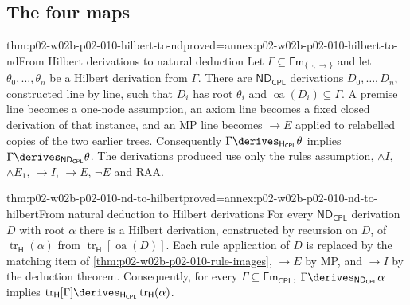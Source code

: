 \subsection{The four maps}
\label{sec:p02-w02b-p02-010-maps}

\begin{hbtheorem}{thm:p02-w02b-p02-010-hilbert-to-nd}{proved=annex:p02-w02b-p02-010-hilbert-to-nd}{From Hilbert derivations to natural deduction}
Let \(\Gamma\subseteq\mathsf{Fm}_{\{\neg,\to\}}\) and let
\(\theta_0,\ldots,\theta_n\) be a Hilbert derivation from \(\Gamma\).  There
are \(\mathsf{ND}_{\mathsf{CPL}}\) derivations \(D_0,\ldots,D_n\), constructed
line by line, such that \(D_i\) has root \(\theta_i\) and
\(\operatorname{oa}(D_i)\subseteq\Gamma\).  A premise line becomes a one-node
assumption, an axiom line becomes a fixed closed derivation of that
instance, and an MP line becomes \(\to E\) applied to relabelled copies of
the two earlier trees.  Consequently
\(\Gamma\derives_{\mathsf H_{\mathsf{CPL}}}\theta\) implies
\(\Gamma\derives_{\mathsf{ND}_{\mathsf{CPL}}}\theta\).  The derivations
produced use only the rules assumption, \(\land I\), \(\land E_1\),
\(\to I\), \(\to E\), \(\neg E\) and RAA.
\end{hbtheorem}

\begin{hbtheorem}{thm:p02-w02b-p02-010-nd-to-hilbert}{proved=annex:p02-w02b-p02-010-nd-to-hilbert}{From natural deduction to Hilbert derivations}
For every \(\mathsf{ND}_{\mathsf{CPL}}\) derivation \(D\) with root
\(\alpha\) there is a Hilbert derivation, constructed by recursion on \(D\),
of \(\operatorname{tr}_{\mathsf H}(\alpha)\) from
\(\operatorname{tr}_{\mathsf H}[\operatorname{oa}(D)]\).  Each rule
application of \(D\) is replaced by the matching item of
\cref{thm:p02-w02b-p02-010-rule-images}, \(\to E\) by MP, and \(\to I\) by
the deduction theorem.  Consequently, for every
\(\Gamma\subseteq\mathsf{Fm}_{\mathsf{CPL}}\),
\(\Gamma\derives_{\mathsf{ND}_{\mathsf{CPL}}}\alpha\) implies
\(\operatorname{tr}_{\mathsf H}[\Gamma]\derives_{\mathsf H_{\mathsf{CPL}}}
\operatorname{tr}_{\mathsf H}(\alpha)\).
\end{hbtheorem}

